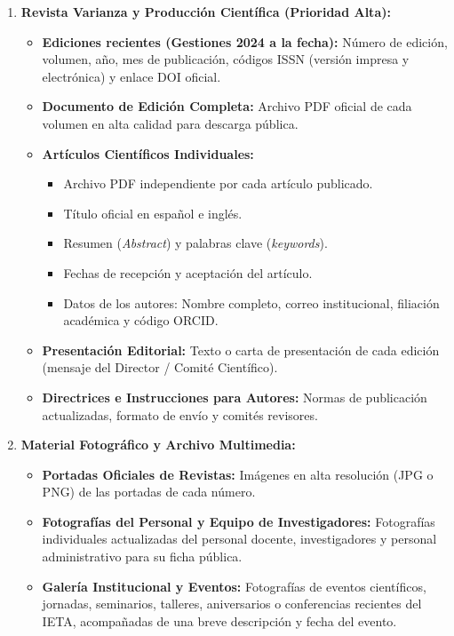 \documentclass[11pt,letterpaper]{article}
\begin{document}
\begin{enumerate}[label=\textbf{\color{ietaBlue}\arabic*.}, leftmargin=1.5em]
    \item \textbf{Revista Varianza y Producción Científica (Prioridad Alta):}
    \begin{itemize}[leftmargin=1.2em, itemsep=2pt]
        \item \textbf{Ediciones recientes (Gestiones 2024 a la fecha):} Número de edición, volumen, año, mes de publicación, códigos ISSN (versión impresa y electrónica) y enlace DOI oficial.
        \item \textbf{Documento de Edición Completa:} Archivo PDF oficial de cada volumen en alta calidad para descarga pública.
        \item \textbf{Artículos Científicos Individuales:}
        \begin{itemize}[leftmargin=1em]
            \item Archivo PDF independiente por cada artículo publicado.
            \item Título oficial en español e inglés.
            \item Resumen (\textit{Abstract}) y palabras clave (\textit{keywords}).
            \item Fechas de recepción y aceptación del artículo.
            \item Datos de los autores: Nombre completo, correo institucional, filiación académica y código ORCID.
        \end{itemize}
        \item \textbf{Presentación Editorial:} Texto o carta de presentación de cada edición (mensaje del Director / Comité Científico).
        \item \textbf{Directrices e Instrucciones para Autores:} Normas de publicación actualizadas, formato de envío y comités revisores.
    \end{itemize}

    \item \textbf{Material Fotográfico y Archivo Multimedia:}
    \begin{itemize}[leftmargin=1.2em, itemsep=2pt]
        \item \textbf{Portadas Oficiales de Revistas:} Imágenes en alta resolución (JPG o PNG) de las portadas de cada número.
        \item \textbf{Fotografías del Personal y Equipo de Investigadores:} Fotografías individuales actualizadas del personal docente, investigadores y personal administrativo para su ficha pública.
        \item \textbf{Galería Institucional y Eventos:} Fotografías de eventos científicos, jornadas, seminarios, talleres, aniversarios o conferencias recientes del IETA, acompañadas de una breve descripción y fecha del evento.
    \end{itemize}


\end{enumerate}
\end{document}

